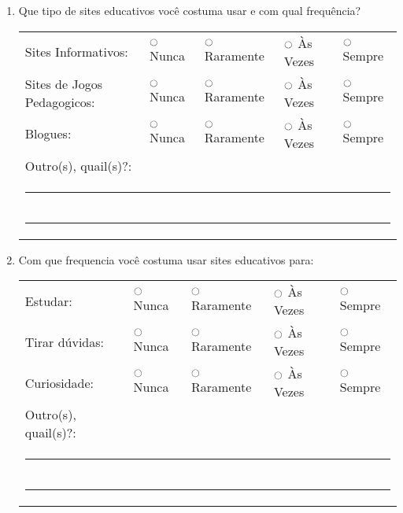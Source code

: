 \begin{enumerate}
\item Que tipo de sites educativos você costuma usar e com qual frequência? \\
\begin{tabular}{lllll}
	Sites Informativos: & $\ocircle$ Nunca & $\ocircle$ Raramente & $\ocircle$ Às Vezes & $\ocircle$ Sempre \\
	Sites de Jogos Pedagogicos: & $\ocircle$ Nunca & $\ocircle$ Raramente & $\ocircle$ Às Vezes & $\ocircle$ Sempre \\
	Blogues: & $\ocircle$ Nunca & $\ocircle$ Raramente & $\ocircle$ Às Vezes & $\ocircle$ Sempre \\
	Outro(s), quail(s)?: \\
	\multicolumn{5}{l}{\noindent\rule{\textwidth}{0.4pt}} \\
	\multicolumn{5}{l}{\noindent\rule{\textwidth}{0.4pt}} \\
\end{tabular}

\item Com que frequencia você costuma usar sites educativos para: \\
\begin{tabular}{lllll}
	Estudar: & $\ocircle$ Nunca & $\ocircle$ Raramente & $\ocircle$ Às Vezes & $\ocircle$ Sempre \\
	Tirar dúvidas: & $\ocircle$ Nunca & $\ocircle$ Raramente & $\ocircle$ Às Vezes & $\ocircle$ Sempre \\
	Curiosidade: & $\ocircle$ Nunca & $\ocircle$ Raramente & $\ocircle$ Às Vezes & $\ocircle$ Sempre \\
	Outro(s), quail(s)?: \\
	\multicolumn{5}{l}{\noindent\rule{\textwidth}{0.4pt}} \\
	\multicolumn{5}{l}{\noindent\rule{\textwidth}{0.4pt}} \\
\end{tabular}

\end{enumerate}

